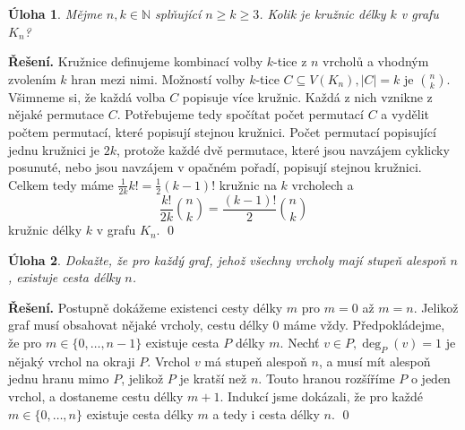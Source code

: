 \documentclass{article}
\newtheorem{uloha}{Úloha}
\newcommand{\N}{\mathbb{N}}
\newenvironment{reseni}{\noindent\textbf{Řešení.}\hspace{0.5em}}{\hfill\qed\medskip}
\begin{document}
\begin{uloha}
Mějme $n, k \in \N$ splňující $n \geq k \geq 3$. Kolik je kružnic délky $k$ v grafu $K_n$?
\end{uloha}
\begin{reseni}
Kružnice definujeme kombinací volby $k$-tice z $n$ vrcholů a vhodným zvolením $k$ hran mezi nimi.
Možností volby $k$-tice $C \subseteq V(K_n), |C|=k$ je $n \choose k$. 
Všimneme si, že každá volba $C$ popisuje více kružnic. Každá z nich vznikne
z nějaké permutace $C$. Potřebujeme tedy spočítat počet permutací $C$ a vydělit počtem permutací, které popisují stejnou kružnici.
Počet permutací popisující jednu kružnici je $2k$, protože každé dvě permutace, které jsou navzájem cyklicky posunuté, nebo jsou navzájem v opačném pořadí, popisují stejnou kružnici.
Celkem tedy máme $\frac{1}{2k}k! = \frac{1}{2} (k-1)!$ kružnic na $k$ vrcholech a 
$$
\frac{k!}{2k}\binom{n}{k} =
\frac{(k-1)!}{2}\binom{n}{k} 
$$
kružnic délky $k$ v grafu $K_n$.
\end{reseni}
\begin{uloha}
Dokažte, že pro každý graf, jehož všechny vrcholy mají stupeň alespoň $n$, existuje cesta délky $n$.
\end{uloha}
\begin{reseni}
Postupně dokážeme existenci cesty délky $m$ pro $m=0$ až $m=n$.
Jelikož graf musí obsahovat nějaké vrcholy, cestu délky 0 máme vždy.
Předpokládejme, že pro $m \in \{0, \dots, n-1 \}$ existuje cesta $P$ délky $m$.
Nechť $v\in P, \deg_P(v)=1$ je nějaký vrchol na okraji $P$. 
Vrchol $v$ má stupeň alespoň $n$, a musí mít alespoň jednu hranu mimo $P$, 
jelikož $P$ je kratší než $n$. Touto hranou rozšíříme $P$ o jeden vrchol,
a dostaneme cestu délky $m+1$. Indukcí jsme dokázali, že pro každé $m \in \{0, \dots, n\}$
existuje cesta délky $m$ a tedy i cesta délky $n$.
\end{reseni}
\end{document}
